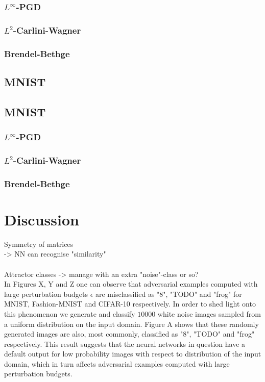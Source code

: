 \documentclass{article}
\begin{document}
\subsubsection{$L^\infty$-PGD}
\subsubsection{$L^2$-Carlini-Wagner}
\subsubsection{Brendel-Bethge}
\subsection{MNIST}

\subsection{MNIST}
\subsubsection{$L^\infty$-PGD}
\subsubsection{$L^2$-Carlini-Wagner}
\subsubsection{Brendel-Bethge}

\section{Discussion}
Symmetry of matrices\\
-> NN can recognise "similarity"\\
\\

Attractor classes -> manage with an extra "noise"-class or so?\\


In Figures X, Y and Z one can observe that adversarial examples computed with large perturbation budgets $\epsilon$ are misclassified as "8", "TODO" and "frog" for MNIST, Fashion-MNIST and CIFAR-10 respectively. In order to shed light onto this phenomenon we generate and classify $10000$ white noise images sampled from a uniform distribution on the input domain. Figure A shows that these randomly generated images are also, most commonly, classified as "8", "TODO" and "frog" respectively. This result suggests that the neural networks in question have a default output for low probability images with respect to distribution of the input domain, which in turn affects adversarial examples computed with large perturbation budgets.
\end{document}
